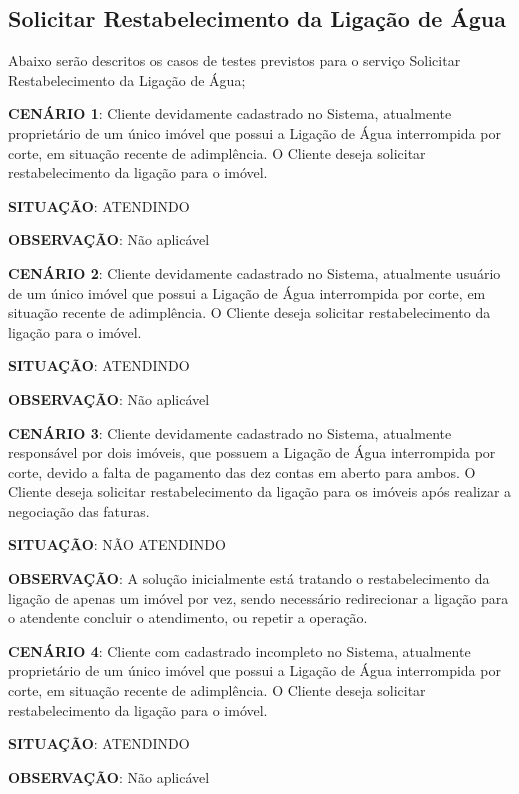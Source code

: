 \subsection{Solicitar Restabelecimento da Ligação de Água}
Abaixo serão descritos os casos de testes previstos para o serviço Solicitar Restabelecimento da Ligação de Água;
\begin{flushleft}
	\begin{description}
		\item \textbf{CENÁRIO 1}: Cliente devidamente cadastrado no Sistema, atualmente proprietário de um único imóvel que possui a Ligação de Água interrompida por corte, em situação recente de adimplência. O Cliente deseja solicitar restabelecimento da ligação para o imóvel.
		\item \textbf{SITUAÇÃO}: ATENDINDO
		\item \textbf{OBSERVAÇÃO}: Não aplicável
	\end{description}
	\begin{description}
		\item \textbf{CENÁRIO 2}: Cliente devidamente cadastrado no Sistema, atualmente usuário de um único imóvel que possui a Ligação de Água interrompida por corte, em situação recente de adimplência. O Cliente deseja solicitar restabelecimento da ligação para o imóvel.
		\item \textbf{SITUAÇÃO}: ATENDINDO
		\item \textbf{OBSERVAÇÃO}: Não aplicável
	\end{description}
	\begin{description}
		\item \textbf{CENÁRIO 3}: Cliente devidamente cadastrado no Sistema, atualmente responsável por dois imóveis, que possuem a Ligação de Água interrompida por corte, devido a falta de pagamento das dez contas em aberto para ambos. O Cliente deseja solicitar restabelecimento da ligação para os imóveis após realizar a negociação das faturas.
		\item \textbf{SITUAÇÃO}: NÃO ATENDINDO
		\item \textbf{OBSERVAÇÃO}: A solução inicialmente está tratando o restabelecimento da ligação de apenas um imóvel por vez, sendo necessário redirecionar a ligação para o atendente concluir o atendimento, ou repetir a operação.
	\end{description}
	
	\begin{description}
		\item \textbf{CENÁRIO 4}: Cliente com cadastrado incompleto no Sistema, atualmente proprietário de um único imóvel que possui a Ligação de Água interrompida por corte, em situação recente de adimplência. O Cliente deseja solicitar restabelecimento da ligação para o imóvel.
		\item \textbf{SITUAÇÃO}: ATENDINDO
		\item \textbf{OBSERVAÇÃO}: Não aplicável	
	\end{description}
\end{flushleft}	

